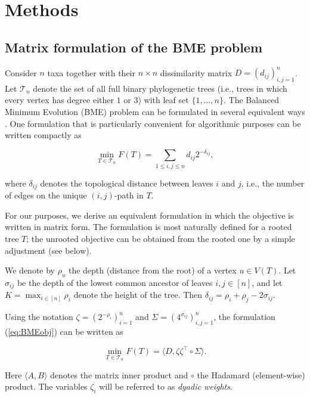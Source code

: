 \documentclass{article}
\begin{document}
 \section{Methods}

 \subsection{Matrix formulation of the BME problem}

Consider $n$ taxa together with their $n \times n$ dissimilarity matrix $D=(d_{ij})_{i,j=1}^n$. Let $\mathcal{T}_n$ denote the set of all full binary phylogenetic trees (i.e., trees in which every vertex has degree either $1$ or $3$) with leaf set $\{1,\ldots,n\}$. The Balanced Minimum Evolution (BME) problem can be formulated in several equivalent ways \cite{desper2004theoretical,pauplin2000direct}. One formulation that is particularly convenient for algorithmic purposes can be written compactly as

\begin{equation}\label{eq:BMEobj}
\min_{T\in \mathcal{T}_n} F(T) = \sum_{1 \le i,j \le n} d_{ij}2^{-\delta_{ij}},
\end{equation}

\noindent
where $\delta_{ij}$ denotes the topological distance between leaves $i$ and $j$, i.e., the number of edges on the unique $(i,j)$-path in $T$.

For our purposes, we derive an equivalent formulation in which the objective is written in matrix form. The formulation is most
naturally defined for a rooted tree $T$; the unrooted objective can be obtained from the rooted one by a simple adjustment (see below).

We denote by $\rho_u$ the depth (distance from the root) of
a vertex $u\in V(T)$. Let $\sigma_{ij}$ be the depth of the
lowest common ancestor of leaves $i,j\in [n]$, and let
$K=\max_{i\in[n]}\rho_i$ denote the height of the tree.
Then $\delta_{ij}=\rho_i+\rho_j-2\sigma_{ij}$.

Using the notation
$\zeta=(2^{-\rho_i})_{i=1}^n$
and
$\Sigma=(4^{\sigma_{ij}})_{i,j=1}^n$,
the formulation (\ref{eq:BMEobj}) can be written as

\begin{equation}\label{eq:BMEobjMatr}
\min_{T\in \mathcal{T}_n} F(T)
= \langle D, \zeta\zeta^{\top}\circ\Sigma\rangle.
\end{equation}

\noindent
Here $\langle A,B\rangle$ denotes the matrix inner product and
$\circ$ the Hadamard (element-wise) product. The variables
$\zeta_i$ will be referred to as {\it dyadic weights}.
\end{document}
